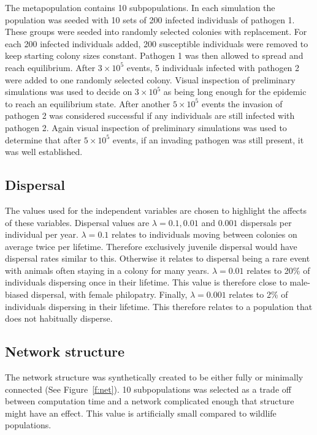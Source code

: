 The metapopulation contains 10 subpopulations.
In each simulation the population was seeded with 10 sets of 200 infected individuals of pathogen 1.
These groups were seeded into randomly selected colonies with replacement.
For each 200 infected individuals added, 200 susceptible individuals were removed to keep starting colony sizes constant. 
Pathogen 1 was then allowed to spread and reach equilibrium. 
After \ensuremath{3\times 10^{5}} events, 5 individuals infected with pathogen 2 were added to one randomly selected colony. 
Visual inspection of preliminary simulations was used to decide on \ensuremath{3\times 10^{5}} as being long enough for the epidemic to reach an equilibrium state.
After another \ensuremath{5\times 10^{5}} events the invasion of pathogen 2 was considered successful if any individuals are still infected with pathogen 2.
Again visual inspection of preliminary simulations was used to determine that after \ensuremath{5\times 10^{5}} events, if an invading pathogen was still present, it was well established. 


\subsection{Dispersal}

The values used for the independent variables are chosen to highlight the affects of these variables. 
Dispersal values are $\lambda = 0.1, 0.01$ and $ 0.001$ dispersals per individual per year. 
$\lambda = 0.1$ relates to individuals moving between colonies on average twice per lifetime. 
Therefore exclusively juvenile dispersal would have dispersal rates similar to this. %
Otherwise it relates to dispersal being a rare event with animals often staying in a colony for many years.
$\lambda = 0.01$ relates to 20\% of individuals dispersing once in their lifetime.
This value is therefore close to male-biased dispersal, with female philopatry. %
Finally, $\lambda = 0.001$ relates to 2\% of individuals dispersing in their lifetime.
This therefore relates to a population that does not habitually disperse.




\subsection{Network structure}
The network structure was synthetically created to be either fully or minimally connected (See Figure~\ref{f:net}). 
10 subpopulations was selected as a trade off between computation time and a network complicated enough that structure might have an effect. 
This value is artificially small compared to wildlife populations. 



